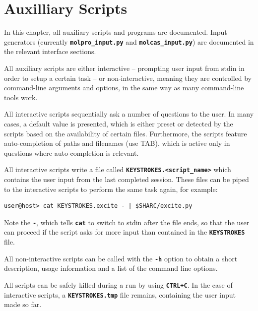 \documentclass[a4paper,11pt,DIV=15,openany,twoside=false]{scrbook}
\newcommand{\ttt}[1]{\textbf{\texttt{#1}}}
\begin{document}

\chapter{Auxilliary Scripts}\label{chap:aux}

In this chapter, all auxiliary scripts and programs are documented. Input generators (currently \ttt{molpro\_input.py} and \ttt{molcas\_input.py}) are documented in the relevant interface sections.

All auxiliary scripts are either interactive -- prompting user input from stdin in order to setup a certain task -- or non-interactive, meaning they are controlled by command-line arguments and options, in the same way as many command-line tools work.

All interactive scripts sequentially ask a number of questions to the user. In many cases, a default value is presented, which is either preset or detected by the scripts based on the availability of certain files. Furthermore, the scripts feature auto-completion of paths and filenames (use TAB), which is active only in questions where auto-completion is relevant.

All interactive scripts write a file called \ttt{KEYSTROKES.<script\_name>} which contains the user input from the last completed session. These files can be piped to the interactive scripts to perform the same task again, for example:
\begin{verbatim}
user@host> cat KEYSTROKES.excite - | $SHARC/excite.py
\end{verbatim}
Note the \ttt{-}, which tells \ttt{cat} to switch to stdin after the file ends, so that the user can proceed if the script asks for more input than contained in the \ttt{KEYSTROKES} file.

All non-interactive scripts can be called with the \ttt{-h} option to obtain a short description, usage information and a list of the command line options.

All scripts can be safely killed during a run by using \ttt{CTRL+C}. In the case of interactive scripts, a \ttt{KEYSTROKES.tmp} file remains, containing the user input made so far.
\end{document}
